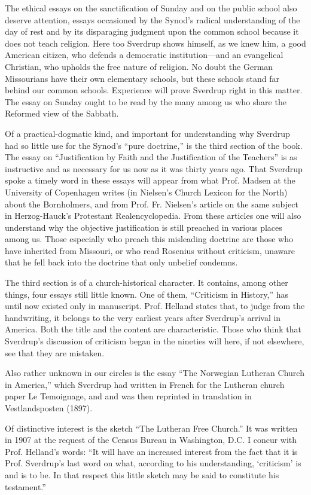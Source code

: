 The ethical essays on the sanctification of Sunday and on the public school also deserve attention, essays occasioned by the Synod’s radical understanding of the day of rest and by its disparaging judgment upon the common school because it does not teach religion. Here too Sverdrup shows himself, as we knew him, a good American citizen, who defends a democratic institution—and an evangelical Christian, who upholds the free nature of religion. No doubt the German Missourians have their own elementary schools, but these schools stand far behind our common schools. Experience will prove Sverdrup right in this matter. The essay on Sunday ought to be read by the many among us who share the Reformed view of the Sabbath.

Of a practical-dogmatic kind, and important for understanding why Sverdrup had so little use for the Synod’s “pure doctrine,” is the third section of the book. The essay on “Justification by Faith and the Justification of the Teachers” is as instructive and as necessary for us now as it was thirty years ago. That Sverdrup spoke a timely word in these essays will appear from what Prof. Madsen at the University of Copenhagen writes (in Nielsen’s Church Lexicon for the North) about the Bornholmers, and from Prof. Fr. Nielsen’s article on the same subject in Herzog-Hauck’s Protestant Realencyclopedia. From these articles one will also understand why the objective justification is still preached in various places among us. Those especially who preach this misleading doctrine are those who have inherited from Missouri, or who read Rosenius without criticism, unaware that he fell back into the doctrine that only unbelief condemns.

The third section is of a church-historical character. It contains, among other things, four essays still little known. One of them, “Criticism in History,” has until now existed only in manuscript. Prof. Helland states that, to judge from the handwriting, it belongs to the very earliest years after Sverdrup’s arrival in America. Both the title and the content are characteristic. Those who think that Sverdrup’s discussion of criticism began in the nineties will here, if not elsewhere, see that they are mistaken.

Also rather unknown in our circles is the essay “The Norwegian Lutheran Church in America,” which Sverdrup had written in French for the Lutheran church paper Le Temoignage, and and was then reprinted in translation in Vestlandsposten (1897).

Of distinctive interest is the sketch “The Lutheran Free Church.” It was written in 1907 at the request of the Census Bureau in Washington, D.C. I concur with Prof. Helland’s words: “It will have an increased interest from the fact that it is Prof. Sverdrup’s last word on what, according to his understanding, ‘criticism’ is and is to be. In that respect this little sketch may be said to constitute his testament.”

